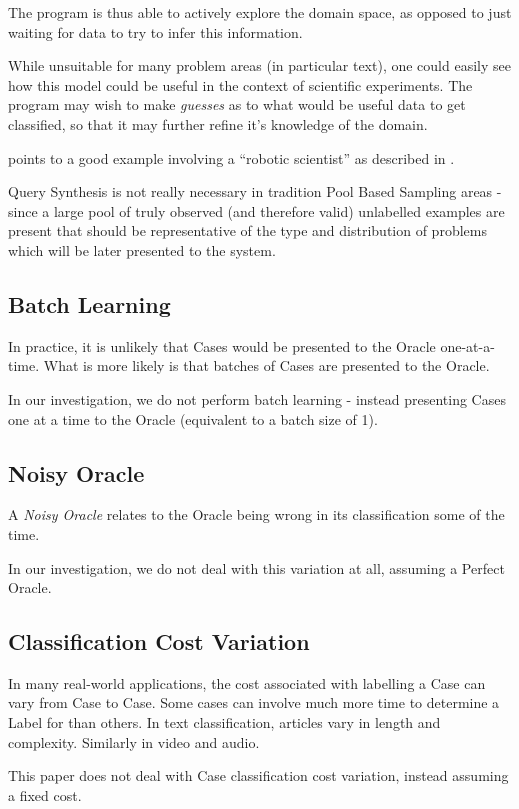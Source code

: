 \documentclass[a4paper,11pt]{report}
\begin{document}
The program is thus able to actively explore the domain space, as opposed to just waiting for data to try to infer this information.

While unsuitable for many problem areas (in particular text), one could easily see how this model could be useful in the context of scientific experiments. The program may wish to make \emph{guesses} as to what would be useful data to get classified, so that it may further refine it's knowledge of the domain.

\citep{Settles2010} points to a good example involving a ``robotic scientist'' as described in \citep{King2009}.

Query Synthesis is not really necessary in tradition Pool Based Sampling areas - since a large pool of truly observed (and therefore valid) unlabelled examples are present that should be representative of the type and distribution of problems which will be later presented to the system.

\subsection{Batch Learning}
In practice, it is unlikely that Cases would be presented to the Oracle one-at-a-time. What is more likely is that batches of Cases are presented to the Oracle.

In our investigation, we do not perform batch learning - instead presenting Cases one at a time to the Oracle (equivalent to a batch size of 1).

\subsection{Noisy Oracle}
A \emph{Noisy Oracle} relates to the Oracle being wrong in its classification some of the time.

In our investigation, we do not deal with this variation at all, assuming a Perfect Oracle.

\subsection{Classification Cost Variation}
In many real-world applications, the cost associated with labelling a Case can vary from Case to Case. Some cases can involve much more time to determine a Label for than others. In text classification, articles vary in length and complexity. Similarly in video and audio.

This paper does not deal with Case classification cost variation, instead assuming a fixed cost.
\end{document}

